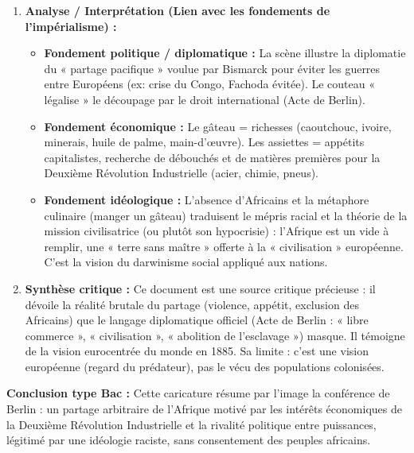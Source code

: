 \documentclass[11pt]{article}
\newcommand{\cle}[1]{{\popxbold\color{popdark}#1}}
\begin{document}
\begin{exoresolu}
\begin{enumerate}
\begin{itemize}
        \item \textbf{Personnages périphériques :} 4 à 5 hommes en costumes civils ou uniformes (représentants de la France, UK, Portugal, Belgique, Italie/Allemagne). Ils sont passifs, assis, tendent des assiettes vides, l'air gourmand ou impatient. Ils attendent leur part.
        \item \textbf{Absence notable :} Aucun Africain n'est représenté à table. Le continent est traité comme une chose (\cle{res nullius}).
    \end{itemize}
    \item \textbf{Analyse / Interprétation (Lien avec les fondements de l'impérialisme) :}
    \begin{itemize}
        \item \textbf{Fondement politique / diplomatique :} La scène illustre la \cle{diplomatie du « partage pacifique »} voulue par Bismarck pour éviter les guerres entre Européens (ex: crise du Congo, Fachoda évitée). Le couteau « légalise » le découpage par le droit international (Acte de Berlin).
        \item \textbf{Fondement économique :} Le gâteau = richesses (caoutchouc, ivoire, minerais, huile de palme, main-d'œuvre). Les assiettes = appétits capitalistes, recherche de \cle{débouchés} et de \cle{matières premières} pour la \cle{Deuxième Révolution Industrielle} (acier, chimie, pneus).
        \item \textbf{Fondement idéologique :} L'absence d'Africains et la métaphore culinaire (manger un gâteau) traduisent le mépris racial et la théorie de la \cle{mission civilisatrice} (ou plutôt son hypocrisie) : l'Afrique est un vide à remplir, une « terre sans maître » offerte à la « civilisation » européenne. C'est la vision du \cle{darwinisme social} appliqué aux nations.
    \end{itemize}
    \item \textbf{Synthèse critique :}
    Ce document est une \cle{source critique} précieuse : il dévoile la réalité brutale du partage (violence, appétit, exclusion des Africains) que le langage diplomatique officiel (Acte de Berlin : « libre commerce », « civilisation », « abolition de l'esclavage ») masque. Il témoigne de la vision eurocentrée du monde en 1885. Sa limite : c'est une vision européenne (regard du prédateur), pas le vécu des populations colonisées.
\end{enumerate}
\textbf{Conclusion type Bac :} Cette caricature résume par l'image la conférence de Berlin : un partage arbitraire de l'Afrique motivé par les intérêts économiques de la Deuxième Révolution Industrielle et la rivalité politique entre puissances, légitimé par une idéologie raciste, sans consentement des peuples africains.
\end{exoresolu}
\end{document}
